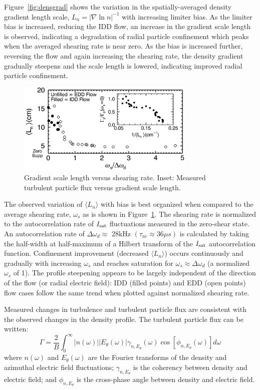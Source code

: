 \documentclass[aps,prl,amsmath,amssymb,preprint,superscriptaddress]{revtex4}
\begin{document}
Figure~\ref{fig:densgrad} shows the variation in the spatially-averaged density gradient length scale, $L_{n} = \lvert \nabla \ln n \rvert ^{-1}$ with
increasing limiter bias.  As the limiter bias is increased, reducing
the IDD flow, an increase in the gradient scale length is observed,
indicating a degradation of radial particle confinement which peaks
when the averaged shearing rate is near zero. As the bias is
increased further, reversing the flow and again increasing the
shearing rate, the density gradient gradually steepens and the
scale length is lowered, indicating improved radial particle confinement.  

\begin{figure}[!htbp]
\centerline{
\includegraphics[width=8.5cm]{shearandgrad}}
\caption{\label{fig:shearandgrad} Gradient scale length versus
  shearing rate. Inset: Measured turbulent particle flux versus
  gradient scale length.}
\end{figure}

The observed variation of $\langle L_{n} \rangle$ with bias is best
organized when compared to the average shearing rate, $\omega_s$ as is
shown in Figure~\ref{fig:shearandgrad}.   The shearing rate is
normalized to the autocorrelation rate of $I_{\rm sat}$ fluctuations
measured in the zero-shear state.  An autocorrelation rate of $\Delta
\omega_{d} \approx $ 28kHz $(\tau_{ac} \approx 36\mu s)$ is calculated by taking the half-width at
half-maximum of a Hilbert transform of the $I_{\rm sat}$
autocorrelation function.  Confinement improvement (decreased $\langle
L_n \rangle$) occurs continuously and gradually with increasing
$\omega_{s}$ and reaches saturation for $\omega_{s} \approx \Delta
\omega_{d}$ (a normalized $\omega_s$ of 1).  The profile steepening
appears to be largely independent of the direction of the flow (or radial electric field): IDD (filled points) and EDD (open points) flow cases follow the same trend when plotted against normalized shearing rate.

Measured changes in turbulence and turbulent particle flux are
consistent with the observed changes in the density profile.  The
turbulent particle flux can be written\cite{powers74}:
\begin{equation}
\Gamma = \frac{2}{B} \int^{\infty}_{0} \lvert n(\omega) \rvert \lvert E_{\theta}(\omega) \rvert \gamma_{n,E_{\theta}}(\omega) \cos [\phi_{n,E_{\theta}}(\omega)] d\omega
\label{eq:fluxint}
\end{equation}
where $n(\omega)$ and $E_\theta(\omega)$ are the Fourier transforms of
the density and azimuthal electric field fluctuations;
$\gamma_{n,E_\theta}$ is the coherency between density and electric
field; and $\phi_{n,E_\theta}$ is the cross-phase angle between
density and electric field.
\end{document}
